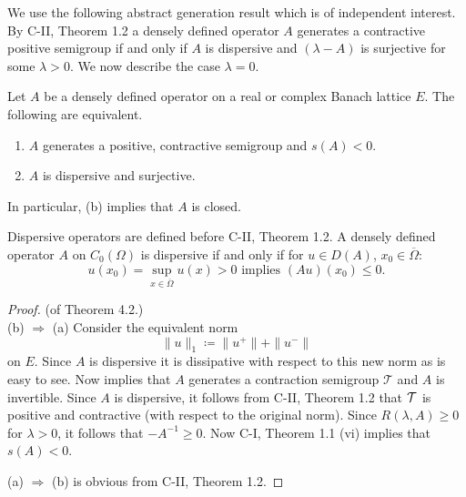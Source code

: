 We use the following abstract generation result which is of independent interest. 
By C-II, Theorem 1.2 a densely defined operator $A$ generates a contractive positive semigroup if and only if $A$ is dispersive and $(\lambda - A)$ is surjective for some $\lambda > 0$.
We now describe the case $\lambda = 0$.
\begin{theorem}
Let $A$ be a densely defined operator on a real or complex Banach lattice $E$. 
The following are equivalent.
\begin{enumerate}[\upshape (a)]
\item  
$A$ generates a positive, contractive semigroup and $s(A) < 0$.
\item  
$A$ is dispersive and surjective.
\end{enumerate}
In particular, (b) implies that $A$ is closed.
\end{theorem}
Dispersive operators are defined before C-II, Theorem 1.2. 
A densely defined operator $A$ on $C_{0}(\Omega)$ is dispersive if and only if for $u \in D(A)$, $x_{0} \in \overline{\Omega}$:
\[
	u(x_{0}) = \sup_{x \in \overline{\Omega}} u(x) > 0 \text{ implies } (Au)(x_{0}) \leq 0.
\]
\begin{proof}(of Theorem 4.2.) \\
(b) $\Rightarrow$ (a)
Consider the equivalent norm
\[
	\|u\|_1 \coloneq \|u^+\| + \|u^-\|
\]
on $E$. 
Since $A$ is dispersive it is dissipative with respect to this new norm as is easy to see. 
Now \citet[Theorem 4.5]{ACM24} implies that $A$ generates a contraction semigroup $\mathcal{T}$ and $A$ is invertible. 
Since $A$ is dispersive, it follows from C-II, Theorem 1.2 that $\mathcal{T}$ is positive and contractive (with respect to the original norm). 
Since $R(\lambda, A) \geq 0$ for $\lambda > 0$, it follows that $-A^{-1} \geq 0$. Now C-I, Theorem 1.1 (vi) implies that $s(A) < 0$.

(a) $\Rightarrow$ (b) is obvious from C-II, Theorem 1.2. 
\end{proof}

